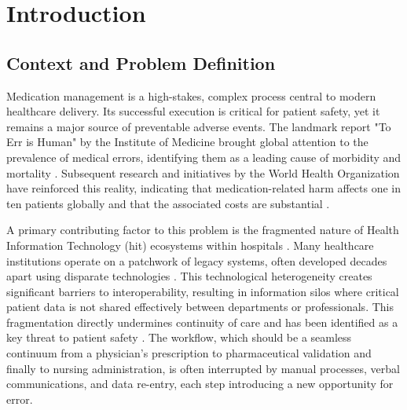 \chapter{Introduction}

\section{Context and Problem Definition}

Medication management is a high-stakes, complex process central to modern healthcare delivery. Its successful execution is critical for patient safety, yet it remains a major source of preventable adverse events. The landmark report "To Err is Human" by the Institute of Medicine brought global attention to the prevalence of medical errors, identifying them as a leading cause of morbidity and mortality \cite{kohn2000}. Subsequent research and initiatives by the World Health Organization have reinforced this reality, indicating that medication-related harm affects one in ten patients globally and that the associated costs are substantial \cite{who2017, who2022}.

A primary contributing factor to this problem is the fragmented nature of Health Information Technology (\gls{hit}) ecosystems within hospitals \cite{berwick2008}. Many healthcare institutions operate on a patchwork of legacy systems, often developed decades apart using disparate technologies \cite{kazemi2016}. This technological heterogeneity creates significant barriers to interoperability, resulting in information silos where critical patient data is not shared effectively between departments or professionals. This fragmentation directly undermines continuity of care and has been identified as a key threat to patient safety \cite{ash2004, keasberry2017}. The workflow, which should be a seamless continuum from a physician's prescription to pharmaceutical validation and finally to nursing administration, is often interrupted by manual processes, verbal communications, and data re-entry, each step introducing a new opportunity for error.

